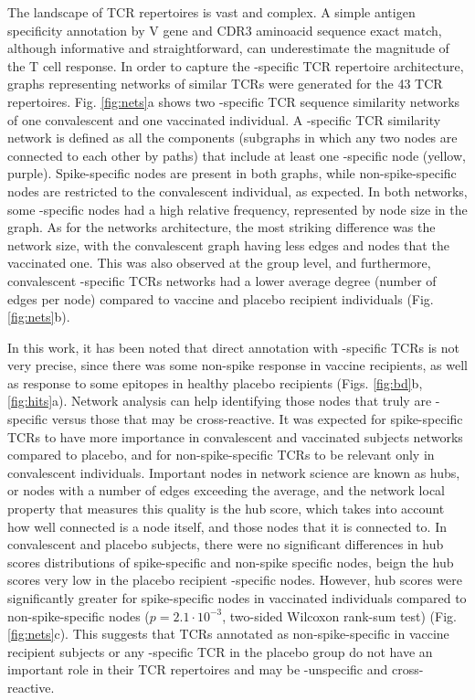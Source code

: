 The landscape of TCR repertoires is vast and complex. A simple antigen specificity annotation by V gene and CDR3 aminoacid sequence exact match, although informative and straightforward, can underestimate the magnitude of the T cell response. In order to capture the \covid-specific TCR repertoire architecture, graphs representing networks of similar TCRs were generated for the 43 TCR repertoires. Fig. \ref{fig:nets}a shows two \covid-specific TCR sequence similarity networks of one convalescent and one vaccinated individual. A \covid-specific TCR similarity network is defined as all the components (subgraphs in which any two nodes are connected to each other by paths) that include at least one \covid-specific node (yellow, purple). Spike-specific nodes are present in both graphs, while non-spike-specific nodes are restricted to the convalescent individual, as expected. In both networks, some \covid-specific nodes had a high relative frequency, represented by node size in the graph. As for the networks architecture, the most striking difference was the network size, with the convalescent graph having less edges and nodes that the vaccinated one. This was also observed at the group level, and furthermore, convalescent \covid-specific TCRs networks had a lower average degree (number of edges per node) compared to vaccine and placebo recipient individuals (Fig. \ref{fig:nets}b).

In this work, it has been noted that direct annotation with \covid-specific TCRs is not very precise, since there was some non-spike response in vaccine recipients, as well as response to some \covid{} epitopes in healthy placebo recipients (Figs. \ref{fig:bd}b, \ref{fig:hits}a). Network analysis can help identifying those nodes that truly are \covid-specific versus those that may be cross-reactive. It was expected for spike-specific TCRs to have more importance in convalescent and vaccinated subjects networks compared to placebo, and for non-spike-specific TCRs to be relevant only in convalescent individuals. Important nodes in network science are known as hubs, or nodes with a number of edges exceeding the average, and the network local property that measures this quality is the hub score, which takes into account how well connected is a node itself, and those nodes that it is connected to. In convalescent and placebo subjects, there were no significant differences in hub scores distributions of spike-specific and non-spike specific nodes, beign the hub scores very low in the placebo recipient \covid-specific nodes. However, hub scores were significantly greater for spike-specific nodes in vaccinated individuals compared to non-spike-specific nodes ($p = 2.1\cdot10^{-3}$, two-sided Wilcoxon rank-sum test) (Fig. \ref{fig:nets}c). This suggests that TCRs annotated as non-spike-specific in vaccine recipient subjects or any \covid-specific TCR in the placebo group do not have an important role in their TCR repertoires and may be \covid-unspecific and cross-reactive.

